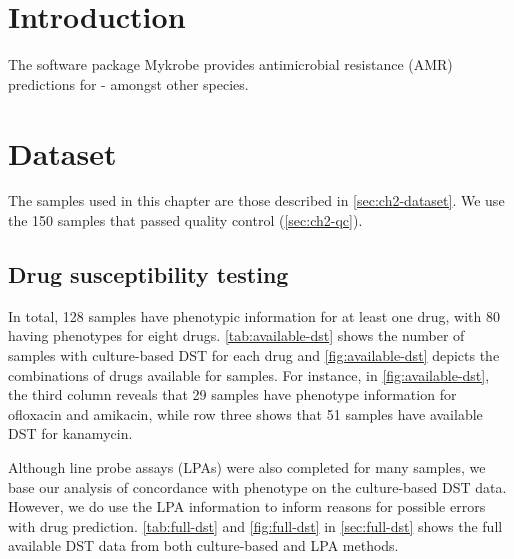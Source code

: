 \section{Introduction}

The software package Mykrobe provides antimicrobial resistance (AMR) predictions for \mtb{} - amongst other species. 

\section{Dataset}
The \mtb{} samples used in this chapter are those described in \autoref{sec:ch2-dataset}. We use the 150 samples that passed quality control (\autoref{sec:ch2-qc}).

\subsection{Drug susceptibility testing}

\noindent
In total, 128 samples have phenotypic information for at least one drug, with 80 having phenotypes for eight drugs. \autoref{tab:available-dst} shows the number of samples with culture-based DST for each drug and \autoref{fig:available-dst} depicts the combinations of drugs available for samples. For instance, in \autoref{fig:available-dst}, the third column reveals that 29 samples have phenotype information for ofloxacin and amikacin, while row three shows that 51 samples have available DST for kanamycin. 

Although line probe assays (LPAs) were also completed for many samples, we base our analysis of concordance with phenotype on the culture-based DST data. However, we do use the LPA information to inform reasons for possible errors with drug prediction. \autoref{tab:full-dst} and \autoref{fig:full-dst} in \autoref{sec:full-dst} shows the full available DST data from both culture-based and LPA methods.

